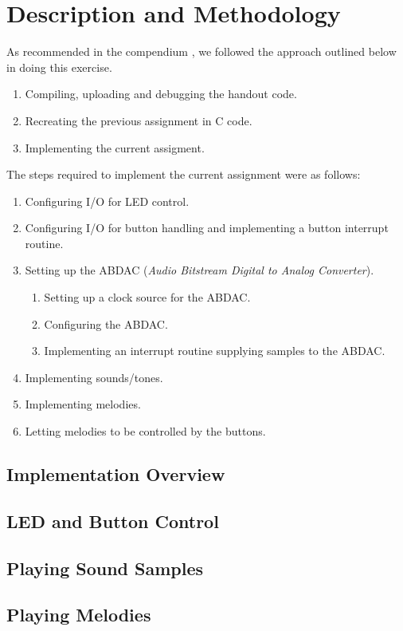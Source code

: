 \section{Description and Methodology}

As recommended in the compendium \cite{comp}, we followed the approach
outlined below in doing this exercise.

\begin{enumerate}
    \item Compiling, uploading and debugging the handout code.
    \item Recreating the previous assignment in C code.
    \item Implementing the current assigment.
\end{enumerate}

The steps required to implement the current assignment were as follows:

\begin{enumerate}
    \item Configuring I/O for LED control.
    \item Configuring I/O for button handling and implementing a button
    interrupt routine.
    \item Setting up the ABDAC (\emph{Audio Bitstream Digital to Analog
    Converter}).
        \begin{enumerate}
            \item Setting up a clock source for the ABDAC.
            \item Configuring the ABDAC.
            \item Implementing an interrupt routine supplying samples to
            the ABDAC.
        \end{enumerate}
    \item Implementing sounds/tones.
    \item Implementing melodies.
    \item Letting melodies to be controlled by the buttons.
\end{enumerate}

\subsection{Implementation Overview}
\subsection{LED and Button Control}
\subsection{Playing Sound Samples}
\subsection{Playing Melodies}
